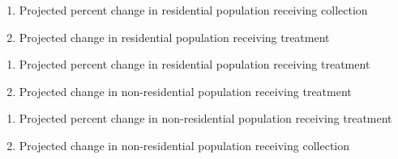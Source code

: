 \documentclass[]{article}
\newenvironment{Shaded}{\begin{snugshade}}{\end{snugshade}}
\newcommand{\StringTok}[1]{\textcolor[rgb]{0.31,0.60,0.02}{#1}}
\newcommand{\OperatorTok}[1]{\textcolor[rgb]{0.81,0.36,0.00}{\textbf{#1}}}
\newcommand{\NormalTok}[1]{#1}
\begin{document}
\begin{enumerate}
\def\labelenumi{\arabic{enumi}.}
\setcounter{enumi}{1}
\item
  Projected percent change in residential population receiving
  collection
\item
  Projected change in residential population receiving treatment
\end{enumerate}

\begin{Shaded}
\end{Shaded}

\begin{enumerate}
\def\labelenumi{\arabic{enumi}.}
\setcounter{enumi}{3}
\item
  Projected percent change in residential population receiving treatment
\item
  Projected change in non-residential population receiving treatment
\end{enumerate}

\begin{Shaded}
\end{Shaded}

\begin{enumerate}
\def\labelenumi{\arabic{enumi}.}
\setcounter{enumi}{5}
\item
  Projected percent change in non-residential population receiving
  treatment
\item
  Projected change in non-residential population receiving collection
\end{enumerate}

\begin{Shaded}
\end{Shaded}
\end{document}
